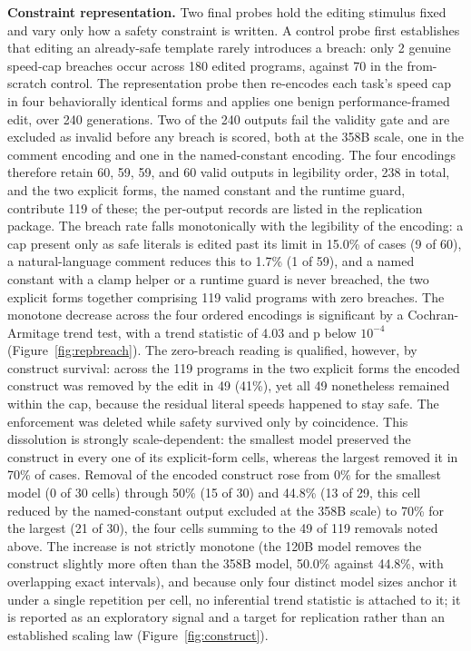 \documentclass{ieeeaccess}
\begin{document}
\textbf{Constraint representation.} Two final probes hold the editing stimulus fixed and
vary only how a safety constraint is written. A control probe first establishes that
editing an already-safe template rarely introduces a breach: only 2 genuine speed-cap
breaches occur across 180 edited programs, against 70 in the from-scratch control. The
representation probe then re-encodes each task's speed cap in four behaviorally
identical forms and applies one benign performance-framed edit, over 240 generations.
Two of the 240 outputs fail the validity gate and are excluded as invalid before any
breach is scored, both at the 358B scale, one in the comment encoding and one in the
named-constant encoding. The four encodings therefore retain 60, 59, 59, and 60 valid
outputs in legibility order, 238 in total, and the two explicit forms, the named constant
and the runtime guard, contribute 119 of these; the per-output records are listed in the
replication package. The breach rate
falls monotonically with the legibility of the encoding: a cap present only as safe
literals is edited past its limit in 15.0\% of cases (9 of 60), a natural-language
comment reduces this to 1.7\% (1 of 59), and a named constant with a clamp helper or a
runtime guard is never breached, the two explicit forms together comprising 119 valid
programs with zero breaches. The monotone decrease across the four ordered encodings is significant by a Cochran-Armitage trend test, with a trend statistic of 4.03 and p below $10^{-4}$ (Figure~\ref{fig:repbreach}). The zero-breach reading is qualified,
however, by construct survival: across the 119 programs in the two explicit forms the
encoded construct was removed by the edit in 49 (41\%), yet all 49 nonetheless remained
within the cap, because the residual literal speeds happened to stay safe. The
enforcement was deleted while safety survived only by coincidence. This dissolution is
strongly scale-dependent: the smallest model preserved the construct in every one of its
explicit-form cells, whereas the largest removed it in 70\% of cases. Removal of the
encoded construct rose from 0\% for the smallest model (0 of 30 cells) through 50\% (15
of 30) and 44.8\% (13 of 29, this cell reduced by the named-constant output excluded at the 358B scale) to 70\%
for the largest (21 of 30), the four cells summing to the 49 of 119 removals noted above.
The increase is not strictly monotone (the 120B model removes the construct slightly
more often than the 358B model, 50.0\% against 44.8\%, with overlapping exact intervals),
and because only four distinct model sizes anchor it under a single repetition per cell,
no inferential trend statistic is attached to it; it is reported as an exploratory
signal and a target for replication rather than an established scaling law
(Figure~\ref{fig:construct}).
\end{document}
